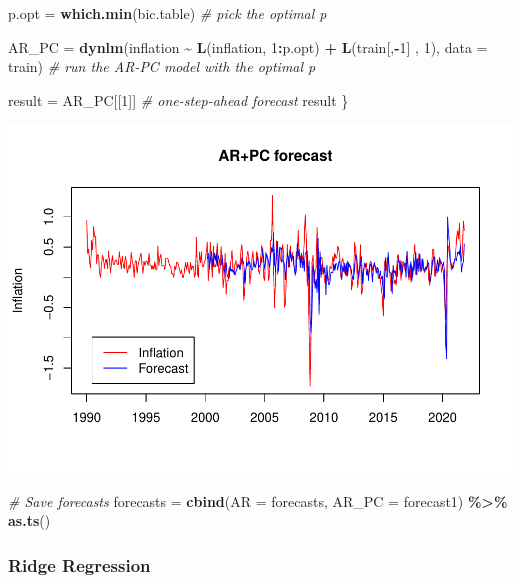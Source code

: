 \documentclass[
]{article}
\newenvironment{Shaded}{\begin{snugshade}}{\end{snugshade}}
\newcommand{\AttributeTok}[1]{\textcolor[rgb]{0.13,0.29,0.53}{#1}}
\newcommand{\CommentTok}[1]{\textcolor[rgb]{0.56,0.35,0.01}{\textit{#1}}}
\newcommand{\DecValTok}[1]{\textcolor[rgb]{0.00,0.00,0.81}{#1}}
\newcommand{\FunctionTok}[1]{\textcolor[rgb]{0.13,0.29,0.53}{\textbf{#1}}}
\newcommand{\NormalTok}[1]{#1}
\newcommand{\OtherTok}[1]{\textcolor[rgb]{0.56,0.35,0.01}{#1}}
\newcommand{\SpecialCharTok}[1]{\textcolor[rgb]{0.81,0.36,0.00}{\textbf{#1}}}
\begin{document}
\begin{Shaded}
\begin{Highlighting}[]
\NormalTok{p.opt }\OtherTok{=} \FunctionTok{which.min}\NormalTok{(bic.table) }\CommentTok{\# pick the optimal p}

\NormalTok{AR\_PC }\OtherTok{=} \FunctionTok{dynlm}\NormalTok{(inflation }\SpecialCharTok{\textasciitilde{}} \FunctionTok{L}\NormalTok{(inflation, }\DecValTok{1}\SpecialCharTok{:}\NormalTok{p.opt) }\SpecialCharTok{+} \FunctionTok{L}\NormalTok{(train[,}\SpecialCharTok{{-}}\DecValTok{1}\NormalTok{] , }\DecValTok{1}\NormalTok{), }
              \AttributeTok{data =}\NormalTok{ train)     }\CommentTok{\# run the AR{-}PC model with the optimal p}

\NormalTok{result }\OtherTok{=}\NormalTok{ AR\_PC[[}\DecValTok{1}\NormalTok{]] }\CommentTok{\# one{-}step{-}ahead forecast}
\NormalTok{result}
\NormalTok{\}}
\end{Highlighting}
\end{Shaded}

\includegraphics{Trabalho_Econo4_Q2_files/figure-latex/unnamed-chunk-16-1.pdf}

\begin{Shaded}
\begin{Highlighting}[]
\CommentTok{\# Save forecasts}
\NormalTok{forecasts }\OtherTok{=} \FunctionTok{cbind}\NormalTok{(}\AttributeTok{AR =}\NormalTok{ forecasts, }\AttributeTok{AR\_PC =}\NormalTok{ forecast1) }\SpecialCharTok{\%\textgreater{}\%} \FunctionTok{as.ts}\NormalTok{()}
\end{Highlighting}
\end{Shaded}

\hypertarget{ridge-regression}{%
\subsubsection{Ridge Regression}\label{ridge-regression}}
\end{document}
